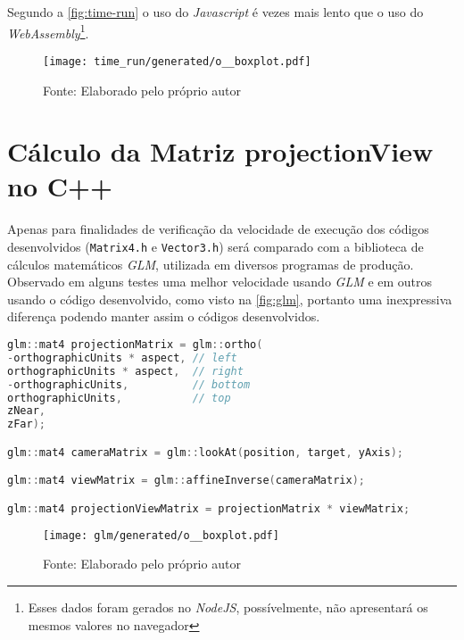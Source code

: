 \documentclass{article}
\begin{document}
Segundo a \autoref{fig:time-run} o uso do \textit{Javascript} é  vezes mais lento que o uso do \textit{WebAssembly}\footnote{Esses dados foram gerados no \textit{NodeJS}, possívelmente, não apresentará os mesmos valores no navegador}.

\begin{figure}[H]
    \centering
    
    \vspace{5pt}
    \texttt{[image: time\_run/generated/o\_\_boxplot.pdf]}
    \vspace{5pt}
    {\par\small Fonte: Elaborado pelo próprio autor}
    
    \label{fig:time-run}
\end{figure}

\section*{Cálculo da Matriz projectionView no C++}

Apenas para finalidades de verificação da velocidade de execução dos códigos desenvolvidos (\verb|Matrix4.h| e \verb|Vector3.h|) será comparado com a biblioteca de cálculos matemáticos \textit{GLM}, utilizada em diversos programas de produção. Observado em alguns testes uma melhor velocidade usando \textit{GLM} e em outros usando o código desenvolvido, como visto na \autoref{fig:glm}, portanto uma inexpressiva diferença podendo manter assim o códigos desenvolvidos.

\begin{lstlisting}[language=c,style=m_lststyle,label=lst:projectionViewGLM,caption=Cálculo da Matriz projectionView usando GLM]
glm::mat4 projectionMatrix = glm::ortho(
-orthographicUnits * aspect, // left
orthographicUnits * aspect,  // right
-orthographicUnits,          // bottom
orthographicUnits,           // top
zNear,
zFar);

glm::mat4 cameraMatrix = glm::lookAt(position, target, yAxis);

glm::mat4 viewMatrix = glm::affineInverse(cameraMatrix);

glm::mat4 projectionViewMatrix = projectionMatrix * viewMatrix;
\end{lstlisting}

\begin{figure}[H]
    \centering
    
    \vspace{5pt}
    \texttt{[image: glm/generated/o\_\_boxplot.pdf]}
    \vspace{5pt}
    {\par\small Fonte: Elaborado pelo próprio autor}
    
    \label{fig:glm}
\end{figure}

\newpage\pagestyle{empty}


\end{document}
